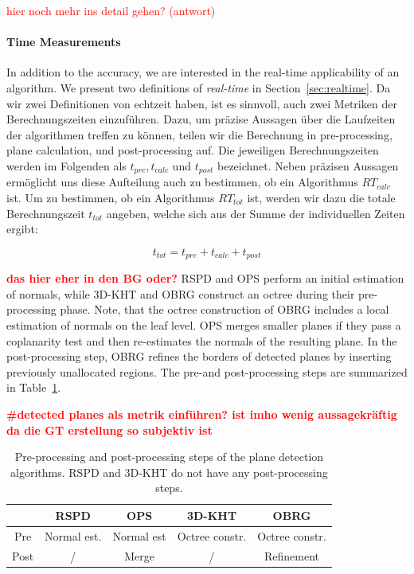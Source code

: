 \documentclass[main.tex]{subfiles}
\begin{document}
\textcolor{red}{hier noch mehr ins detail gehen? (antwort) \underline{\hspace{2cm}}}

\paragraph{Time Measurements}
\label{par:time}
In addition to the accuracy, we are interested in the real-time applicability of an algorithm. We present two definitions
of \textit{real-time} in Section~\ref{sec:realtime}. 
Da wir zwei Definitionen von echtzeit haben, ist es sinnvoll, auch zwei Metriken der Berechnungszeiten einzuführen.
Dazu, um präzise Aussagen über die Laufzeiten der algorithmen treffen zu können, teilen wir die Berechnung in 
pre-processing, plane calculation, und post-processing auf. Die jeweiligen Berechnungszeiten werden im Folgenden als
$t_{pre}, t_{calc}$ und $t_{post}$ bezeichnet. Neben präzisen Aussagen ermöglicht uns diese Aufteilung auch zu bestimmen,
ob ein Algorithmus $RT_{calc}$ ist. Um zu bestimmen, ob ein Algorithmus $RT_{tot}$ ist, werden wir dazu die totale 
Berechnungszeit $t_{tot}$ angeben, welche sich aus der Summe der individuellen Zeiten ergibt:

\begin{equation}
    t_{tot} = t_{pre} + t_{calc} + t_{post}
\end{equation}

\textbf{\textcolor{red}{das hier eher in den BG oder?}}
RSPD and OPS perform an initial estimation of normals, while 3D-KHT and OBRG construct an octree during their
pre-processing phase. Note, that the octree construction of OBRG includes a local estimation of normals on the
leaf level. OPS merges smaller planes if they pass a coplanarity test and then re-estimates the normals of the
resulting plane. In the post-processing step, OBRG refines the borders of detected planes by inserting
previously unallocated regions.
The pre-and post-processing steps are summarized in Table~\ref{tab:pre-post}.

\textbf{\textcolor{red}{\#detected planes als metrik einführen? ist imho wenig aussagekräftig da die GT erstellung so subjektiv ist}}

\begin{table}[H]
    \centering
    \begin{tabular}{c|cccc}
             & RSPD        & OPS        & 3D-KHT         & OBRG           \\ \hline
        Pre  & Normal est. & Normal est & Octree constr. & Octree constr. \\
        Post & /           & Merge      & /              & Refinement
    \end{tabular}
    \caption{Pre-processing and post-processing steps of the plane detection algorithms. RSPD and 3D-KHT do not have any post-processing steps.}
    \label{tab:pre-post}
\end{table}
\end{document}
